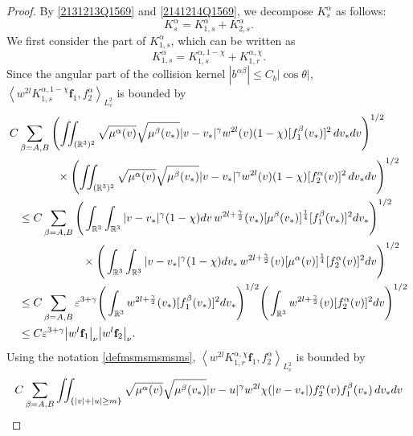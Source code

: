 \documentclass[reqno]{amsart}
\numberwithin{equation}{section}
\numberwithin{equation}{section}
\begin{document}
	\begin{proof}
		By \eqref{2131213Q1569} and \eqref{2141214Q1569}, we decompose $K_{s}^{\alpha}$ as follows:
		\begin{equation}\label{KS1KS2DPPFJ}
			K_{s}^{\alpha}=K_{1,s}^{\alpha}+K_{2,s}^{\alpha}.
		\end{equation}
		We first consider the part of $K_{1,s}^{\alpha}$, which can be written as
		\begin{equation*}
			K_{1,s}^{\alpha}=K^{\alpha,1-\chi}_{1,s}+K_{1,r}^{\alpha,\chi}.
		\end{equation*}
		Since the angular part of the collision kernel  $|b^{\alpha \beta}|\leq C_{b}  |\cos \theta |$, $\left \langle  w^{2l}K_{1,s}^{\alpha,1-\chi}\mathbf{f}_1,f^{\alpha}_2\right \rangle_{L^{2}_{v}} $ is bounded by
		\begin{align}
			C&\sum_{\beta=A,B}\left( \iint_{(\mathbb{R}^3)^2} \sqrt{\mu^\alpha(v)} \sqrt{\mu^\beta(v_*)}|v - v_*|^\gamma w^{2l}(v) (1 - \chi) [f^\beta_1(v_*)]^2 \, dv_* dv \right)^{1/2} \notag\\
			&\hspace{1.2cm} \times \left( \iint_{(\mathbb{R}^3)^2} \sqrt{\mu^\alpha(v)} \sqrt{\mu^\beta(v_*)}|v - v_*|^\gamma w^{2l}(v) (1 - \chi) [f^{\alpha}_2(v)]^2 \, dv_* dv \right)^{1/2} \notag\\
			&\leq C \sum_{\beta=A,B}\Bigg( \int_{\mathbb{R}^3}  \int_{\mathbb{R}^3} |v - v_*|^\gamma (1 - \chi) dv\, w^{2l+\frac{\gamma}{2}}(v_*) [\mu^\beta(v_*)]^{\frac{1}{4}}[f^\beta_1(v_*)]^2dv_* \Bigg)^{1/2} \notag\\
			&\hspace{2cm} \times \Bigg( \int_{\mathbb{R}^3} \int_{\mathbb{R}^3} |v - v_*|^\gamma (1 - \chi) dv_* \, w^{2l+\frac{\gamma}{2}}(v)[\mu^\alpha(v)]^{\frac{1}{4}}[f^{\alpha}_2(v)]^2dv \Bigg)^{1/2} \notag\\
			&\leq C \sum_{\beta=A,B}\varepsilon^{3+\gamma} \Bigg( \int_{\mathbb{R}^3} w^{2l+\frac{\gamma}{2}}(v_*) [f^\beta_1(v_*)]^2 dv_* \Bigg)^{1/2} \Bigg( \int_{\mathbb{R}^3} w^{2l+\frac{\gamma}{2}}(v)[f^{\alpha}_2(v)]^2 dv \Bigg)^{1/2} \notag\\
			&\leq C \varepsilon^{3+\gamma} \big| w^l \mathbf{f}_1 \big|_\nu \big| w^l \mathbf{f}_2 \big|_\nu.\label{k1ssing}
		\end{align}
		Using the notation \eqref{defmsmsmsmsms}, $\left \langle  w^{2l}K_{1,r}^{\alpha,\chi}\mathbf{f}_1,f^{\alpha}_2\right \rangle_{L^{2}_{v}} $ is bounded by
		\begin{align}
			C& \sum_{\beta=A,B}\iint_{\{|v|+|u| \geq m\}} \sqrt{\mu^\alpha(v)} \sqrt{\mu^\beta(v_*)}|v - u|^\gamma w^{2l}\chi(|v - v_*|) f^{\alpha}_2(v)f^\beta_1(v_*) \, dv_* dv \notag\\

\end{align}
\end{proof}
\end{document}
